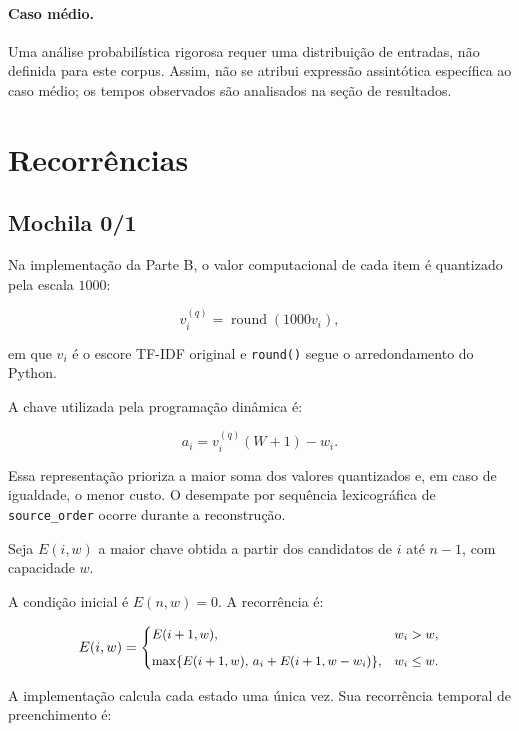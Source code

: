 \documentclass[11pt,a4paper]{article}
\theoremstyle{plain}
\theoremstyle{definition}
\theoremstyle{plain}
\begin{document}
\paragraph{Caso médio.}

Uma análise probabilística rigorosa requer
uma distribuição de entradas, não definida
para este corpus. Assim, não se atribui
expressão assintótica específica ao caso
médio; os tempos observados são analisados
na seção de resultados.


\section{Recorrências}

\subsection{Mochila 0/1}

Na implementação da Parte B,
o valor computacional de cada item
é quantizado pela escala $1000$:

\[
v_i^{(q)}
=
\operatorname{round}(1000v_i),
\]

em que $v_i$ é o escore TF-IDF
original e \texttt{round()} segue
o arredondamento do Python.

A chave utilizada pela programação
dinâmica é:

\begin{equation}
a_i=v_i^{(q)}(W+1)-w_i.
\label{eq:chave_recorrencia_dp}
\end{equation}

Essa representação prioriza a maior
soma dos valores quantizados e,
em caso de igualdade, o menor custo.
O desempate por sequência
lexicográfica de \texttt{source\_order}
ocorre durante a reconstrução.

Seja $E(i,w)$ a maior chave
obtida a partir dos candidatos
de $i$ até $n-1$, com capacidade $w$.

A condição inicial é $E(n,w)=0$.
A recorrência é:


\begin{equation}
\small
E(i,w)=
\begin{cases}
E(i+1,w), & w_i>w,\\[2mm]
\max\{E(i+1,w),\,
a_i+E(i+1,w-w_i)\}, & w_i\leq w.
\end{cases}
\label{eq:recorrencia_mochila_av2}
\end{equation}


A implementação calcula cada
estado uma única vez. Sua recorrência
temporal de preenchimento é:
\end{document}
